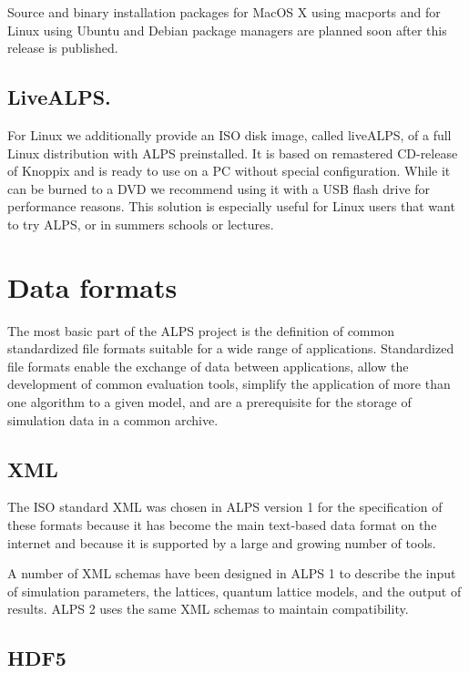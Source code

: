 \documentclass[12pt]{iopart}
\begin{document}
Source and binary installation packages for MacOS X using macports \cite{macports} and for Linux using Ubuntu and Debian package managers are planned soon after this release is published.


\subsection{LiveALPS.}

For Linux we additionally provide an ISO disk image, called liveALPS, of a full Linux distribution with ALPS preinstalled.  It is  
based on remastered CD-release of Knoppix \cite{knoppix} and is ready to use 
on a PC without special configuration. While it can be burned to a DVD we recommend using it with a USB flash drive for performance reasons.
This  solution is especially useful for Linux users that want to try ALPS, or in summers schools or lectures.

\section{Data formats}

The most basic part of the ALPS project is the definition of
common standardized file formats suitable for a wide range of
applications. Standardized file formats enable the exchange of data
between applications, allow the development of common evaluation
tools, simplify the application of more than one algorithm to a given
model, and are a prerequisite for the storage of simulation data in a
common archive.

\subsection{XML}
 The ISO
standard XML \cite{xml} was chosen in ALPS version 1 \cite{ALPS1.2,ALPS1.3} for the specification of these formats
because it has become
the main text-based data format on the internet and because it is
supported by a large and growing number of tools.

A number of XML  schemas \cite{xmlschema} have been designed in ALPS 1 to describe the input of simulation parameters,  the lattices,  quantum lattice models, and the output of results. ALPS 2 uses the same XML schemas to maintain compatibility.

\subsection{HDF5}
\end{document}
